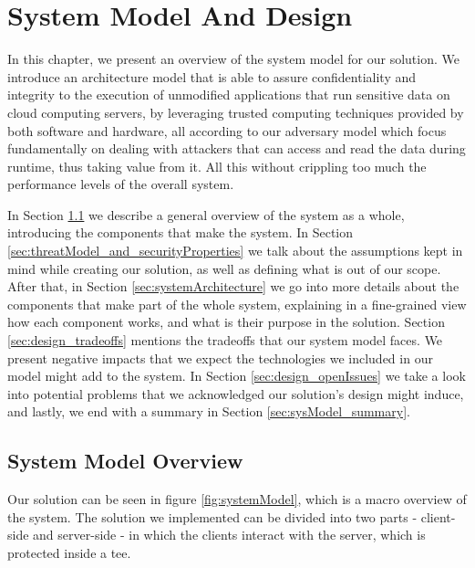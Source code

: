 \chapter{System Model And Design}
\label{cha:systemModel_and_design}

In this chapter, we present an overview of the system model for our solution. We introduce an architecture model that is able to assure confidentiality and integrity to the execution of unmodified applications that run sensitive data on cloud computing servers, by leveraging trusted computing techniques provided by both software and hardware, all according to our adversary model which focus fundamentally on dealing with attackers that can access and read the data during runtime, thus taking value from it. All this without crippling too much the performance levels of the overall system.

In Section \ref{sec:systemModel_overview} we describe a general overview of the system as a whole, introducing the components that make the system. In Section \ref{sec:threatModel_and_securityProperties} we talk about the assumptions kept in mind while creating our solution, as well as defining what is out of our scope.
After that, in Section \ref{sec:systemArchitecture} we go into more details about the components that make part of the whole system, explaining in a fine-grained view how each component works, and what is their purpose in the solution. 
Section \ref{sec:design_tradeoffs} mentions the tradeoffs that our system model faces. We present negative impacts that we expect the technologies we included in our model might add to the system.
In Section \ref{sec:design_openIssues} we take a look into potential problems that we acknowledged our solution's design might induce, and lastly, we end with a summary in Section \ref{sec:sysModel_summary}.





\section{System Model Overview} %
\label{sec:systemModel_overview}

Our solution can be seen in figure \ref{fig:systemModel}, which is a macro overview of the system. 
The solution we implemented can be divided into two parts - client-side and server-side - in which the clients interact with the server, which is protected inside a \gls{tee}. 

